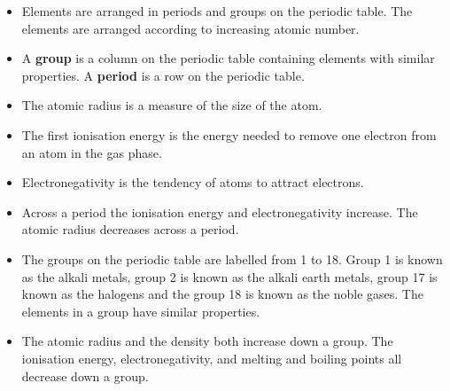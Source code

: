             \label{m38757*uid0123}\begin{itemize}[noitemsep]
\item Elements are arranged in periods and groups on the periodic table. The elements are arranged according to increasing atomic number. 
\item A \textbf{group} is a column on the periodic table containing elements with similar properties. A \textbf{period} is a row on the periodic table.
\item The atomic radius is a measure of the size of the atom.
\item The first ionisation energy is the energy needed to remove one electron from an atom in the gas phase.
\item Electronegativity is the tendency of atoms to attract electrons.
\item Across a period the ionisation energy and electronegativity increase. The atomic radius decreases across a period.
\item The groups on the periodic table are labelled from 1 to 18. Group 1 is known as the alkali metals, group 2 is known as the alkali earth metals, group 17 is known as the halogens and the group 18 is known as the noble gases. The elements in a group have similar properties.
\item The atomic radius and the density both increase down a group. The ionisation energy, electronegativity, and melting and boiling points all decrease down a group.
\end{itemize}
        \label{m38757*eip-219}

